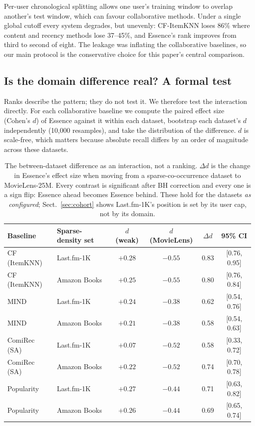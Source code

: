 \documentclass[runningheads]{llncs}
\begin{document}
Per-user chronological splitting allows one user's training window to overlap another's
test window, which can favour collaborative methods. Under a single global cutoff every
system degrades, but unevenly: CF-ItemKNN loses 86\% where content and recency methods lose
37--45\%, and Essence's rank improves from third to second of eight. The leakage was
inflating the collaborative baselines, so our main protocol is the conservative choice for
this paper's central comparison.

\subsection{Is the domain difference real? A formal test}\label{sec:interaction}

Ranks describe the pattern; they do not test it. We therefore test the interaction directly.
For each collaborative baseline we compute the paired effect size (Cohen's $d$) of Essence
against it within each dataset, bootstrap each dataset's $d$ independently (10{,}000
resamples), and take the distribution of the difference. $d$ is scale-free, which matters
because absolute recall differs by an order of magnitude across these datasets.

\begin{table}[t]
\caption{The between-dataset difference as an interaction, not a ranking. $\Delta d$ is the
change in Essence's effect size when moving from a sparse-co-occurrence dataset to
MovieLens-25M. Every contrast is significant after BH correction and every one is a sign
flip: Essence ahead becomes Essence behind. These hold for the datasets \emph{as
configured}; Sect.~\ref{sec:cohort} shows Last.fm-1K's position is set by its user cap, not
by its domain.}\label{tab:interaction}
\centering
\small
\begin{tabular}{@{}llcccc@{}}
\toprule
Baseline & Sparse-density set & $d$ (weak) & $d$ (MovieLens) & $\Delta d$ & 95\% CI \\
\midrule
CF (ItemKNN) & Last.fm-1K & $+0.28$ & $-0.55$ & 0.83 & [0.76, 0.95] \\
CF (ItemKNN) & Amazon Books & $+0.25$ & $-0.55$ & 0.80 & [0.76, 0.84] \\
MIND & Last.fm-1K & $+0.24$ & $-0.38$ & 0.62 & [0.54, 0.76] \\
MIND & Amazon Books & $+0.21$ & $-0.38$ & 0.58 & [0.54, 0.63] \\
ComiRec (SA) & Last.fm-1K & $+0.07$ & $-0.52$ & 0.58 & [0.33, 0.72] \\
ComiRec (SA) & Amazon Books & $+0.22$ & $-0.52$ & 0.74 & [0.70, 0.78] \\
Popularity & Last.fm-1K & $+0.27$ & $-0.44$ & 0.71 & [0.63, 0.82] \\
Popularity & Amazon Books & $+0.26$ & $-0.44$ & 0.69 & [0.65, 0.74] \\
\bottomrule
\end{tabular}
\end{table}
\end{document}
